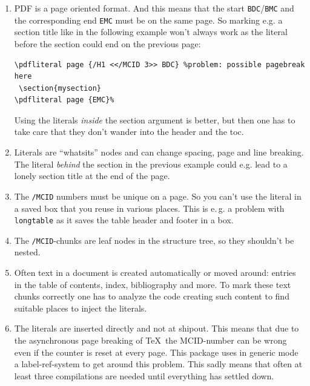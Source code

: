 \documentclass[DIV=12,parskip=half-,bibliography=totoc]{scrartcl}
\newcommand\PDF{PDF}
\begin{document}
\begin{enumerate}[beginpenalty=10000]
  \item \PDF{} is a page oriented format. And this means that the start \texttt{BDC}/\texttt{BMC}  and the corresponding end \texttt{EMC} must be on the same page.
  So marking e.g. a section title like in the following example won't always work  as the literal before the section could end on the previous page:


\begin{lstlisting}
\pdfliteral page {/H1 <</MCID 3>> BDC} %problem: possible pagebreak here
 \section{mysection}
\pdfliteral page {EMC}%
\end{lstlisting}


  Using the literals \emph{inside} the section argument is better, but then one has to take care that they don't wander into the header and the toc.

  \item
  Literals are \enquote{whatsits} nodes and can change spacing, page and line breaking. The literal \emph{behind} the section in the previous example could e.g. lead to a lonely section title at the end of the page.

  \item
   The \texttt{/MCID} numbers must be unique on a page. So you can't use the literal in a saved box that you reuse in various places. This is e.\,g. a problem with \texttt{longtable} as it saves the table header and footer in a box.

  \item
  The  \texttt{/MCID}-chunks are leaf nodes in the structure tree, so they shouldn't be nested.

  \item
  Often text in a document is created automatically or moved around: entries in the table of contents, index, bibliography and more. To mark these text chunks correctly one has to analyze the code creating such content to find suitable places to inject the literals.

  \item
  The literals are inserted directly and not at shipout. This means that due to the asynchronous page breaking of \TeX\ the MCID-number can be wrong even if the counter is reset at every page. This package uses in generic mode a label-ref-system to get around this problem. This sadly means that often at least three compilations are needed until everything has settled down.


\end{enumerate}
\end{document}
